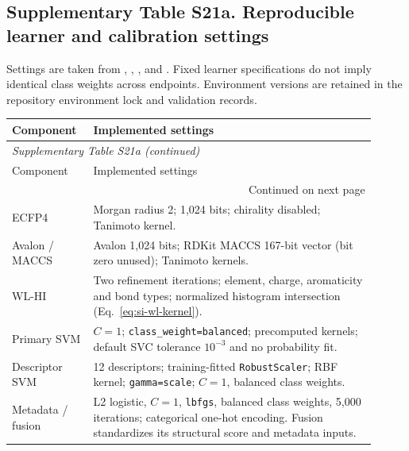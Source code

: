 \subsection*{Supplementary Table S21a. Reproducible learner and calibration settings}

Settings are taken from , , ,  and . Fixed learner specifications do not imply identical class weights across endpoints. Environment versions are retained in the repository environment lock and validation records.

\begingroup\footnotesize\setlength{\tabcolsep}{4pt}

\begin{longtable}{p{0.19\linewidth}p{0.72\linewidth}}

\toprule Component & Implemented settings \\ \midrule\endfirsthead

\multicolumn{2}{l}{\textit{Supplementary Table S21a (continued)}} \\

\toprule Component & Implemented settings \\ \midrule\endhead

\midrule\multicolumn{2}{r}{Continued on next page}\\\endfoot\bottomrule\endlastfoot

ECFP4 & Morgan radius 2; 1,024 bits; chirality disabled; Tanimoto kernel. \\

Avalon / MACCS & Avalon 1,024 bits; RDKit MACCS 167-bit vector (bit zero unused); Tanimoto kernels. \\

WL-HI & Two refinement iterations; element, charge, aromaticity and bond types; normalized histogram intersection (Eq.~\eqref{eq:si-wl-kernel}). \\

Primary SVM & $C=1$; \texttt{class\_weight=balanced}; precomputed kernels; default SVC tolerance $10^{-3}$ and no probability fit. \\

Descriptor SVM & 12 descriptors; training-fitted \texttt{RobustScaler}; RBF kernel; \texttt{gamma=scale}; $C=1$, balanced class weights. \\

Metadata / fusion & L2 logistic, $C=1$, \texttt{lbfgs}, balanced class weights, 5,000 iterations; categorical one-hot encoding. Fusion standardizes its structural score and metadata inputs. \\


\end{longtable}
